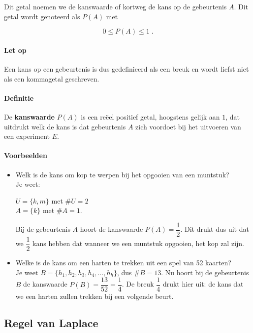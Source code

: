 \documentclass[12pt,twoside]{article}
\begin{document}
Dit getal noemen we de kanswaarde of kortweg de kans op de gebeurtenis $A$. Dit getal wordt genoteerd als $P(A)$ met\\
\begin{mdframed}
$$0 \leq P(A) \leq 1\;.$$
\end{mdframed}

\paragraph*{Let op} Een kans op een gebeurtenis is dus gedefinieerd als een breuk en wordt liefst niet als een kommagetal geschreven.

\paragraph*{Definitie} De {\bf kanswaarde} $P(A)$ is een reëel positief getal, hoogstens gelijk aan $1$, dat uitdrukt welk de kans is dat gebeurtenis $A$ zich voordoet bij het uitvoeren van een experiment $E$.

\paragraph*{Voorbeelden}

\begin{itemize}
  \item Welk is de kans om kop te werpen bij het opgooien van een muntstuk?\\
  Je weet:
  \begin{minipage}[t]{\textwidth}
    $U =\{k, m\}$ met $\#U = 2$\\
    $A = \{k\}$ met $\#A = 1$.
  \end{minipage}
  Bij de gebeurtenis $A$ hoort de kanswaarde $P(A) =\dfrac{1}{2}$. Dit drukt dus uit dat we $\dfrac{1}{2}$ kans hebben dat wanneer we een muntstuk opgooien, het kop zal zijn.
  \item Welke is de kans om een harten te trekken uit een spel van 52 kaarten?\\
  Je weet $B = \{h_1, h_2 , h_3 , h_4 , ..., h_h\}$, dus $\#B=13$.
  Nu hoort bij de gebeurtenis $B$ de kanswaarde $P(B)=\dfrac{13}{52}=\dfrac{1}{4}$. De breuk $\dfrac{1}{4}$ drukt hier uit: de kans dat we een harten zullen trekken bij een volgende beurt.
\end{itemize}

\subsection{Regel van Laplace}
\end{document}
